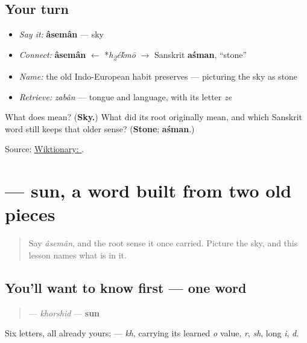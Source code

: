\subsection*{Your turn}
\begin{itemize}
\raggedright
  \item \emph{Say it:} \textbf{âsemân} — sky
  \item \emph{Connect:} \textbf{âsemân} $\leftarrow$ *\emph{h\textsubscript{2}é\'{k}mō} $\to$ Sanskrit \textbf{aśman}, \textquotedblleft{}stone\textquotedblright{}
  \item \emph{Name:} the old Indo-European habit \textbf{} preserves — picturing the sky as stone
  \item \emph{Retrieve:} \emph{zabân} — tongue and language, with its letter \emph{ze}
\end{itemize}

\begin{tcolorbox}[breakable,colback=teal!4,colframe=teal!35!black,title={Before you move on}]
What does \textbf{} mean? (\textbf{Sky.}) What did its root originally mean, and which Sanskrit word still keeps that older sense? (\textbf{Stone}; \textbf{aśman}.)

Source: \href{https://en.wiktionary.org/wiki/\%D8\%A2\%D8\%B3\%D9\%85\%D8\%A7\%D9\%86}{Wiktionary: }.
\end{tcolorbox}
\section[\texorpdfstring{\fa{خورشید} (khorshid)}{خورشید (khorshid)}]{ — sun, a word built from two old pieces}

\label{lesson:FA-C13-khorshid}



\begin{quote}
Say \emph{âsemân}, and the root sense it once carried. Picture the sky, and this lesson names what is in it.
\end{quote}

\subsection*{You'll want to know first — one word}
\begin{quote}
\textbf{} — \emph{khorshid} — \textbf{sun}
\end{quote}

Six letters, all already yours: \textbf{     } — \emph{kh}, \textbf{} carrying its learned \emph{o} value, \emph{r}, \emph{sh}, long \emph{i}, \emph{d}.

